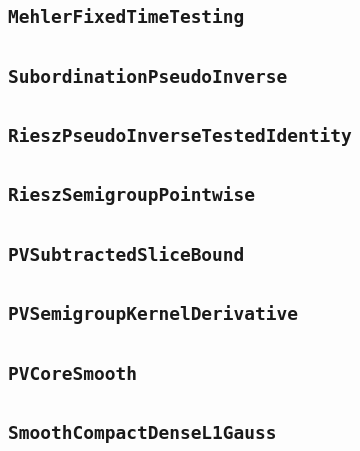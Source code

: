 \documentclass[11pt]{amsart}
\theoremstyle{definition}
\begin{document}
\subsection{\texorpdfstring{\texttt{MehlerFixedTimeTesting}}{MehlerFixedTimeTesting}}\label{node:MehlerFixedTimeTesting}


\subsection{\texorpdfstring{\texttt{SubordinationPseudoInverse}}{SubordinationPseudoInverse}}\label{node:SubordinationPseudoInverse}


\subsection{\texorpdfstring{\texttt{RieszPseudoInverseTestedIdentity}}{RieszPseudoInverseTestedIdentity}}\label{node:RieszPseudoInverseTestedIdentity}


\subsection{\texorpdfstring{\texttt{RieszSemigroupPointwise}}{RieszSemigroupPointwise}}\label{node:RieszSemigroupPointwise}


\subsection{\texorpdfstring{\texttt{PVSubtractedSliceBound}}{PVSubtractedSliceBound}}\label{node:PVSubtractedSliceBound}


\subsection{\texorpdfstring{\texttt{PVSemigroupKernelDerivative}}{PVSemigroupKernelDerivative}}\label{node:PVSemigroupKernelDerivative}


\subsection{\texorpdfstring{\texttt{PVCoreSmooth}}{PVCoreSmooth}}\label{node:PVCoreSmooth}


\subsection{\texorpdfstring{\texttt{SmoothCompactDenseL1Gauss}}{SmoothCompactDenseL1Gauss}}\label{node:SmoothCompactDenseL1Gauss}

\end{document}
